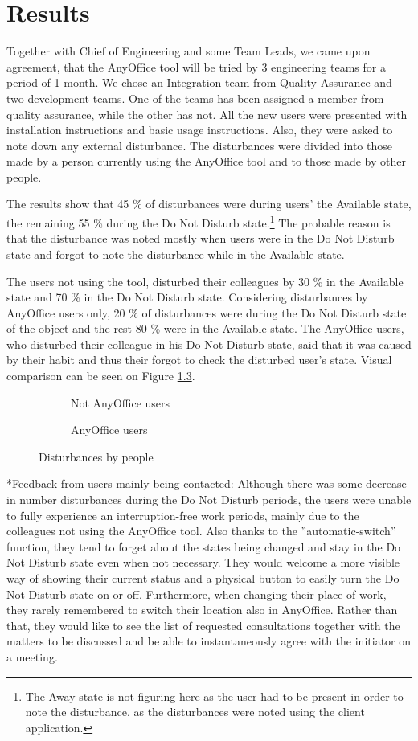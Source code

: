 \documentclass[11pt,singleside]{myfithesis2}
\makeatletter
\newcommand{\twopict}[9]{
	\begin{figure}[h!]
  		\vspace{-7px}
		\begin{subfigure}{.5\textwidth}
  			\centerline{\fcolorbox{darkgray}{palegray}{\texttt{[image: \#2]}}}
  			\caption{#1}
  			\label{#3}
		\end{subfigure}
		\begin{subfigure}{.5\textwidth}
  			\centerline{\fcolorbox{darkgray}{palegray}{\texttt{[image: \#5]}}}
  			\caption{#4}
  			\label{#6}
		\end{subfigure}
		\caption{#7}
		\label{#9}
	\end{figure}
}
\renewcommand\paragraph{
   \vspace{-10pt}
   \@startsection{paragraph}{4}{0mm}
      {\baselineskip}
      {- 5pt}
      {\normalfont\normalsize\bfseries}
}
\makeatother
\begin{document}
\chapter{Results}\label{results}
Together with Chief of Engineering and some Team Leads, we came upon agreement, that the AnyOffice tool will be tried by 3 engineering teams for a period of 1 month. We chose an Integration team from Quality Assurance and two development teams. One of the teams has been assigned a member from quality assurance, while the other has not. All the new users were presented with installation instructions and basic usage instructions. Also, they were asked to note down any external disturbance. The disturbances were divided into those made by a person currently using the AnyOffice tool and to those made by other people.

The results show that 45 \% of disturbances were during users' the Available state, the remaining 55 \% during the Do Not Disturb state.\footnote{The Away state is not figuring here as the user had to be present in order to note the disturbance, as the disturbances were noted using the client application.} The probable reason is that the disturbance was noted mostly when users were in the Do Not Disturb state and forgot to note the disturbance while in the Available state.

The users not using the tool, disturbed their colleagues by 30 \% in the Available state and 70 \% in the Do Not Disturb state. Considering disturbances by AnyOffice users only, 20 \% of disturbances were during the Do Not Disturb state of the object and the rest 80 \% were in the Available state. The AnyOffice users, who disturbed their colleague in his Do Not Disturb state, said that it was caused by their habit and thus their forgot to check the disturbed user's state. Visual comparison can be seen on Figure \ref{pic:disturbancesGraphs}.

\twopict{Not AnyOffice users}{data/aoNotDisturbances.png}{pic:aoNotDisturbances}{AnyOffice users}{data/aoDisturbances.png}{pic:aoDisturbances}{Disturbances by people}{width=0.9\textwidth}{pic:disturbancesGraphs}

\paragraph*{Feedback from users mainly being contacted: } Although there was some decrease in number disturbances during the Do Not Disturb periods, the users were unable to fully experience an interruption-free work periods, mainly due to the colleagues not using the AnyOffice tool. Also thanks to the ''automatic-switch'' function, they tend to forget about the states being changed and stay in the Do Not Disturb state even when not necessary. They would welcome a more visible way of showing their current status and a physical button to easily turn the Do Not Disturb state on or off. Furthermore, when changing their place of work, they rarely remembered to switch their location also in AnyOffice. Rather than that, they would like to see the list of requested consultations together with the matters to be discussed and be able to instantaneously agree with the initiator on a meeting.
\end{document}
